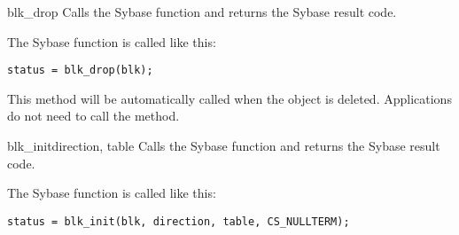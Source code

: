 \begin{methoddesc}[CS_BLKDESC]{blk_drop}{}
Calls the Sybase  function and returns the Sybase
result code.

The Sybase  function is called like this:

\begin{verbatim}
status = blk_drop(blk);
\end{verbatim}

This method will be automatically called when the 
object is deleted.  Applications do not need to call the method.
\end{methoddesc}

\begin{methoddesc}[CS_BLKDESC]{blk_init}{direction, table}
Calls the Sybase  function and returns the Sybase
result code.

The Sybase  function is called like this:

\begin{verbatim}
status = blk_init(blk, direction, table, CS_NULLTERM);
\end{verbatim}
\end{methoddesc}

